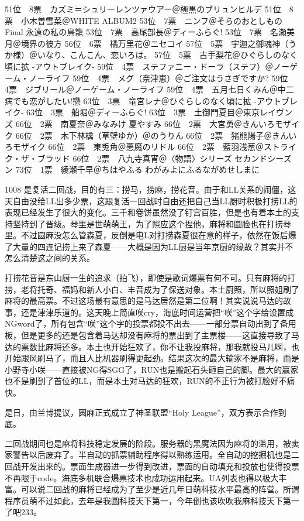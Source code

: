 	51位　8票　カズミ＝シュリーレンツァウアー＠極黒のブリュンヒルデ
	51位　8票　小木曽雪菜＠WHITE ALBUM2
	53位　7票　ニンフ＠そらのおとしものFinal 永遠の私の鳥籠
	53位　7票　高尾部長＠ディーふらぐ!
	53位　7票　名瀬美月＠境界の彼方
	56位　6票　橘万里花＠ニセコイ
	57位　5票　宇迦之御魂神（うか様）＠いなり、こんこん、恋いろは。
	57位　5票　古手梨花＠ひぐらしのなく頃に拡 -アウトブレイク-
	59位　4票　ステファニー・ドーラ（ステフ）＠ノーゲーム・ノーライフ
	59位　4票　メグ（奈津恵）＠ご注文はうさぎですか?
	59位　4票　ジブリール＠ノーゲーム・ノーライフ
	59位　4票　五月七日くみん＠中二病でも恋がしたい!戀
	63位　3票　竜宮レナ＠ひぐらしのなく頃に拡 -アウトブレイク-
	63位　3票　船堀＠ディーふらぐ!
	63位　3票　土御門夏目＠東京レイヴンズ
	66位　2票　南夏奈＠みなみけ 夏やすみ
	66位　2票　大宮勇＠きんいろモザイク
	66位　2票　木下林檎（草壁ゆか）＠のうりん
	66位　2票　猪熊陽子＠きんいろモザイク
	66位　2票　東兎角＠悪魔のリドル
	66位　2票　藍羽浅葱＠ストライク・ザ・ブラッド
	66位　2票　八九寺真宵＠〈物語〉シリーズ セカンドシーズン
	73位　1票　綾瀬千早＠ちはやふる わがみよにふるながめせしまに

1008 是复活二回战，目的有三：捞马，捞麻，捞花音。由于和LL关系的闹僵，这天自由没给LL出多少票，这跟复活一回战时自由还把自己当LL厨时积极打捞LL的表现已经发生了很大的变化。三千和卷饼虽然没了钉宫百胜，但是也有着本土的支持坚持到了晋级。琴里是世萌萌王，为了照应这个捏他，麻将和圆脸也在打捞琴里。不过圆麻没怎么管森夏，反倒是电L对打捞森夏很在意的样子，依然在饭后爆了大量的四连记捞上来了森夏——大概是因为LL厨是当年京厨的缘故？其实并不怎么清楚这之间的关系。

打捞花音是东山厨一生的追求（拍飞），即使是歌词爆票有何不可。只有麻将的打捞，老将托奇、福妈和新人小白、丰音成为了保送对象。本土厨照，所以照姐刷了麻将的最高票。不过这场最有意思的是马达居然是第二位啊！其实说说马达的故事，还是津津乐道的。这天晚上简直咲cry，海底时间运营把“咲”这个字给设置成NGword了，所有包含“咲”这个字的投票都投不出去——一部分票自动出到了备用板，但是更多的还是包含着马达却没有麻将的票出到了主票楼——这直接导致了马达的票数比麻将还多。本土也开始狂欢了，你不让我投麻将，那我就投马儿啊，也开始跟风刷马了，而且人比机器刷得更起劲。结果这次的最大输家不是麻将，而是小野寺小咲——直接被NG得SGG了，RUN也是搬起石头砸自己的脚。最大的赢家也不是刷到了首位的LL，而是本土对马达的狂欢，RUN的不正行为被打脸好不痛快。

是日，由兰博提议，圆麻正式成立了神圣联盟“Holy League”，双方表示合作到底。

二回战期间也是麻将科技稳定发展的阶段。服务器的黑魔法因为麻将的滥用，被卖家警告以后废弃了。半自动的抓票辅助程序得以熟练运用。全自动的挖掘机也是二回战开发出来的。票面生成器进一步得到改进，票面的自动填充和投放也使得投票不再限于code。海底多机联合爆票技术也成功运用起来。UA列表也得以极大丰富。可以说二回战的麻将已经成为了至少是近几年日萌科技水平最高的阵营。所谓程序员萌不过如此，去年是我圆科技天下第一，今年倒也该吹吹我麻科技天下第一了吧233。

